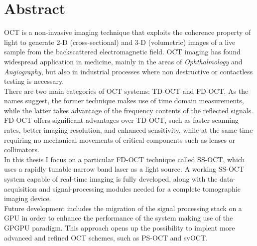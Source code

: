\begingroup
\let\clearpage\relax
\let\cleardoublepage\relax
\let\cleardoublepage\relax

\chapter*{Abstract}
\ac{OCT} is a non-invasive imaging technique that exploits the coherence property of light to generate 2-D (cross-sectional) and 3-D (volumetric) images of a live sample from the backscattered electromagnetic field. OCT imaging has found wide\-spread application in medicine, mainly in the areas of \emph{Ophthalmology} and \emph{Angiography}, but also in industrial processes where non destructive or contactless testing is necessary.\\ %

\noindent There are two main categories of OCT systems: \ac{TD-OCT} and \ac{FD-OCT}. As the names suggest, the former technique makes use of time domain measurements, while the latter takes advantage of the  frequency contents of the reflected signals. FD-OCT offers significant advantages over TD-OCT, such as faster scanning rates, better imaging resolution, and enhanced sensitivity, while at the same time requiring no mechanical movements of critical components such as lenses or collimators. \\

\noindent In this thesis I focus on a particular FD-OCT technique called \ac{SS-OCT}, which uses a rapidly tunable narrow band laser as a light source. A working SS-OCT system capable of real-time imaging is fully developed, along with the data-acquisition and signal-processing modules needed for a complete tomographic imaging device. \\

\noindent Future development includes the migration of the signal processing stack on a \ac{GPU} in order to enhance the performance of the system making use of the \ac{GPGPU} paradigm. This approach opens up the possibility to implent more advanced and refined OCT schemes, such as \ac{PS-OCT} and \ac{svOCT}. 

\vfill

